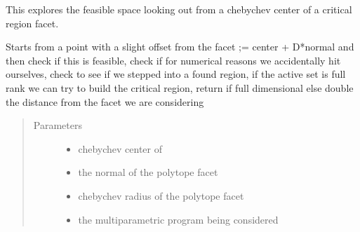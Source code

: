 \documentclass[letterpaper,10pt,english]{sphinxmanual}
\begin{document}

\begin{fulllineitems}
\label{\detokenize{ppopt.mp_solvers:ppopt.mp_solvers.solver_utils.fathem_facet}}
\sphinxAtStartPar
This explores the feasible space looking out from a chebychev center of a critical region facet.

\sphinxAtStartPar
Starts from a point with a slight offset from the facet ;= center + D*normal and then check if this is feasible, check if for numerical reasons we accidentally hit ourselves,
check to see if we stepped into a found region, if the active set is full rank we can try to build the critical region, return if full dimensional else double the distance from the facet we are considering
\begin{quote}\begin{description}
\item[{Parameters}] \leavevmode\begin{itemize}
\item {} 
\sphinxAtStartPar
{} \textendash{} chebychev center of

\item {} 
\sphinxAtStartPar
{} \textendash{} the normal of the polytope facet

\item {} 
\sphinxAtStartPar
{} \textendash{} chebychev radius of the polytope facet

\item {} 
\sphinxAtStartPar
{} \textendash{} the multiparametric program being considered


\end{itemize}
\end{description}
\end{quote}
\end{fulllineitems}
\end{document}
